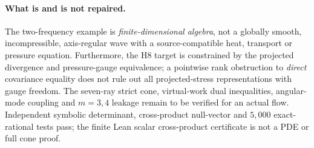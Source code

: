 \paragraph{What is and is not repaired.}
The two-frequency example is \emph{finite-dimensional algebra},
not a globally smooth, incompressible, axis-regular wave with a
source-compatible heat, transport or pressure equation.
Furthermore, the H8 target is constrained by the projected
divergence and pressure-gauge equivalence; a pointwise rank
obstruction to \emph{direct} covariance equality does not rule
out all projected-stress representations with gauge freedom.
The seven-ray strict cone, virtual-work dual inequalities,
angular-mode coupling and $m=3,4$ leakage remain to be
verified for an actual flow. Independent symbolic determinant,
cross-product null-vector and $5{,}000$ exact-rational tests
pass; the finite Lean scalar cross-product certificate is not
a PDE or full cone proof.
